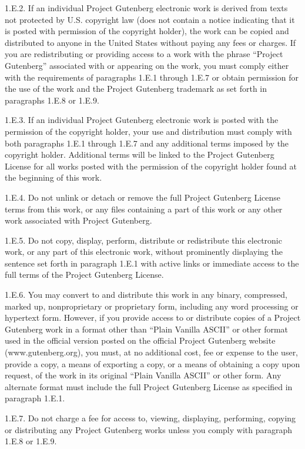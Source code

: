 \documentclass[12pt,openright]{book}
\begin{document}
1.E.2. If an individual Project Gutenberg electronic work is derived from texts not protected by U.S. copyright law (does not contain a notice indicating that it is posted with permission of the copyright holder), the work can be copied and distributed to anyone in the United States without paying any fees or charges. If you are redistributing or providing access to a work with the phrase “Project Gutenberg” associated with or appearing on the work, you must comply either with the requirements of paragraphs 1.E.1 through 1.E.7 or obtain permission for the use of the work and the Project Gutenberg trademark as set forth in paragraphs 1.E.8 or 1.E.9.

1.E.3. If an individual Project Gutenberg electronic work is posted with the permission of the copyright holder, your use and distribution must comply with both paragraphs 1.E.1 through 1.E.7 and any additional terms imposed by the copyright holder. Additional terms will be linked to the Project Gutenberg License for all works posted with the permission of the copyright holder found at the beginning of this work.

1.E.4. Do not unlink or detach or remove the full Project Gutenberg License terms from this work, or any files containing a part of this work or any other work associated with Project Gutenberg.

1.E.5. Do not copy, display, perform, distribute or redistribute this electronic work, or any part of this electronic work, without prominently displaying the sentence set forth in paragraph 1.E.1 with active links or immediate access to the full terms of the Project Gutenberg License.

1.E.6. You may convert to and distribute this work in any binary, compressed, marked up, nonproprietary or proprietary form, including any word processing or hypertext form. However, if you provide access to or distribute copies of a Project Gutenberg work in a format other than “Plain Vanilla ASCII” or other format used in the official version posted on the official Project Gutenberg website (www.gutenberg.org), you must, at no additional cost, fee or expense to the user, provide a copy, a means of exporting a copy, or a means of obtaining a copy upon request, of the work in its original “Plain Vanilla ASCII” or other form. Any alternate format must include the full Project Gutenberg License as specified in paragraph 1.E.1.

1.E.7. Do not charge a fee for access to, viewing, displaying, performing, copying or distributing any Project Gutenberg works unless you comply with paragraph 1.E.8 or 1.E.9.
\end{document}
